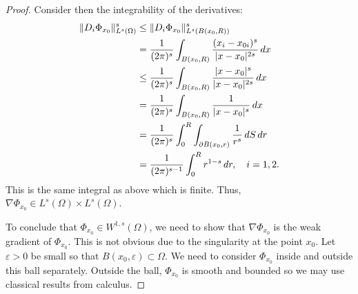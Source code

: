 \documentclass[english, 12pt, a4paper, sci, utf8, a-2b, online]{aaltothesis}
\theoremstyle{definition}
\theoremstyle{plain}
\DeclarePairedDelimiter\abs{\lvert}{\rvert}
\DeclarePairedDelimiter\norm{\lVert}{\rVert}
\newcommand*\diff{\mathop{}\!d}
\numberwithin{equation}{section}
\begin{document}
\begin{proof}
    Consider then the integrability of the derivatives:
    \begin{align*}
        \norm{D_i \Phi_{x_0}}_{L^s(\Omega)}^s
        &\leq \norm{D_i \Phi_{x_0}}_{L^s(B(x_0,R))}^s \\
        &= \frac{1}{(2\pi)^s} \int_{B(x_0,R)}
            \frac{(x_i - x_{0i})^s}{\abs{x-x_0}^{2s}} \diff x \\
        &\leq \frac{1}{(2\pi)^s} \int_{B(x_0,R)}
            \frac{\abs{x-x_0}^s}{\abs{x-x_0}^{2s}} \diff x \\
        &= \frac{1}{(2\pi)^s} \int_{B(x_0,R)}
            \frac{1}{\abs{x-x_0}^s} \diff x \\
        &= \frac{1}{(2\pi)^s} \int_{0}^{R} \int_{\partial B(x_0,r)}
            \frac{1}{r^s} \diff S \diff r \\
        &= \frac{1}{(2\pi)^{s-1}} \int_{0}^{R} r^{1-s} \diff r,
        \quad i=1,2.
    \end{align*}
    This is the same integral as above which is finite.
    Thus, $\nabla \Phi_{x_0} \in L^s(\Omega) \times L^s(\Omega)$.

    To conclude that $\Phi_{x_0} \in W^{1,s}(\Omega)$, we need to show that
    $\nabla \Phi_{x_0}$ is the weak gradient of $\Phi_{x_0}$.
    This is not obvious due to the singularity at the point $x_0$.
    Let $\varepsilon > 0$ be small so that
    $B(x_0,\varepsilon) \subset \Omega$.
    We need to consider $\Phi_{x_0}$ inside and outside this ball separately.
    Outside the ball, $\Phi_{x_0}$ is smooth and bounded
    so we may use classical results from calculus.
    

\end{proof}
\end{document}
